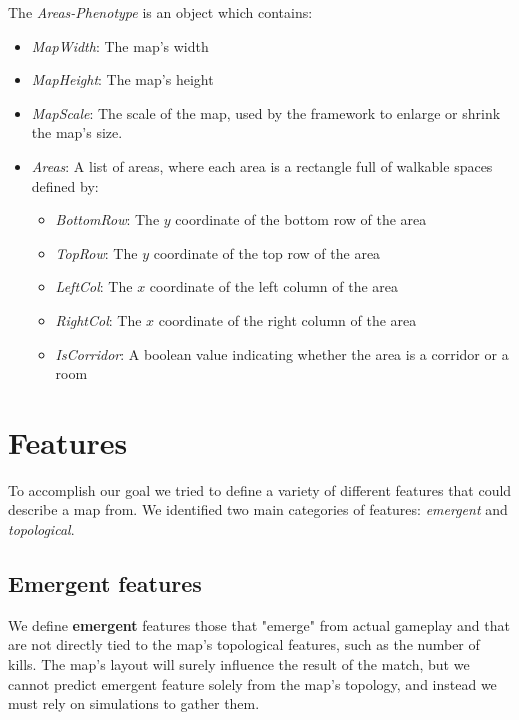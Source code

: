 \documentclass{Configuration_Files/PoliMi3i_thesis}
\begin{document}
The \textit{Areas-Phenotype} is an object which contains:

\begin{itemize}
    \item \textit{MapWidth}: The map's width
    \item \textit{MapHeight}: The map's height
    \item \textit{MapScale}: The scale of the map, used by the framework to enlarge or shrink the map's size.
    \item \textit{Areas}: A list of areas, where each area is a rectangle full of walkable spaces defined by:
    \begin{itemize}
        \item \textit{BottomRow}: The $y$ coordinate of the bottom row of the area
        \item \textit{TopRow}: The $y$ coordinate of the top row of the area
        \item \textit{LeftCol}: The $x$ coordinate of the left column of the area
        \item \textit{RightCol}: The $x$ coordinate of the right column of the area
        \item \textit{IsCorridor}: A boolean value indicating whether the area is a corridor or a room
    \end{itemize}
\end{itemize}

\section{Features}
\label{sec:features}
To accomplish our goal we tried to define a variety of different features that could describe a map from. We identified two main categories of features:  \textit{emergent} and \textit{topological}.

\subsection{Emergent features}
\label{subsec:emergent_features}
We define \textbf{emergent} features those that "emerge" from actual gameplay and that are not directly tied to the map's topological features, such as the number of kills. The map's layout will surely influence the result of the match, but we cannot predict emergent feature solely from the map's topology, and instead we must rely on simulations to gather them.
\end{document}
